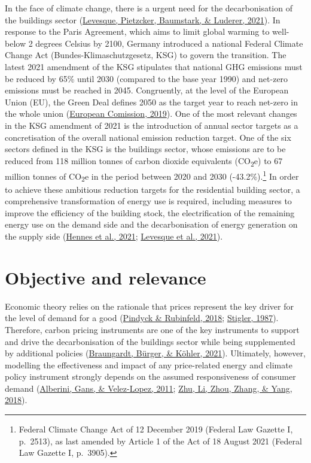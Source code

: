 \documentclass[12pt,twoside]{reedthesis}
\begin{document}
In the face of climate change, there is a urgent need for the decarbonisation of the buildings sector (\protect\hyperlink{ref-levesque_etal21}{Levesque, Pietzcker, Baumstark, \& Luderer, 2021}). In response to the Paris Agreement, which aims to limit global warming to well-below 2 degrees Celsius by 2100, Germany introduced a national Federal Climate Change Act (Bundes-Klimaschutzgesetz, KSG) to govern the transition. The latest 2021 amendment of the KSG stipulates that national GHG emissions must be reduced by 65\% until 2030 (compared to the base year 1990) and net-zero emissions must be reached in 2045. Congruently, at the level of the European Union (EU), the Green Deal defines 2050 as the target year to reach net-zero in the whole union (\protect\hyperlink{ref-europeancomission19}{European Comission, 2019}). One of the most relevant changes in the KSG amendment of 2021 is the introduction of annual sector targets as a concretisation of the overall national emission reduction target. One of the six sectors defined in the KSG is the buildings sector, whose emissions are to be reduced from 118 million tonnes of carbon dioxide equivalents (CO\textsubscript{2}e) to 67 million tonnes of CO\textsubscript{2}e in the period between 2020 and 2030 (-43.2\%).\footnote{Federal Climate Change Act of 12 December 2019 (Federal Law Gazette I, p.~2513), as last amended by Article 1 of the Act of 18 August 2021 (Federal Law Gazette I, p.~3905).} In order to achieve these ambitious reduction targets for the residential building sector, a comprehensive transformation of energy use is required, including measures to improve the efficiency of the building stock, the electrification of the remaining energy use on the demand side and the decarbonisation of energy generation on the supply side (\protect\hyperlink{ref-hennes_etal21}{Hennes et al., 2021}; \protect\hyperlink{ref-levesque_etal21}{Levesque et al., 2021}).

\hypertarget{relevance}{%
\section{Objective and relevance}\label{relevance}}

Economic theory relies on the rationale that prices represent the key driver for the level of demand for a good (\protect\hyperlink{ref-pindyck_rubinfeld18}{Pindyck \& Rubinfeld, 2018}; \protect\hyperlink{ref-stigler87}{Stigler, 1987}). Therefore, carbon pricing instruments are one of the key instruments to support and drive the decarbonisation of the buildings sector while being supplemented by additional policies (\protect\hyperlink{ref-braungardt_etal21}{Braungardt, Bürger, \& Köhler, 2021}). Ultimately, however, modelling the effectiveness and impact of any price-related energy and climate policy instrument strongly depends on the assumed responsiveness of consumer demand (\protect\hyperlink{ref-alberini_etal11}{Alberini, Gans, \& Velez-Lopez, 2011}; \protect\hyperlink{ref-zhu_etal18}{Zhu, Li, Zhou, Zhang, \& Yang, 2018}).
\end{document}
